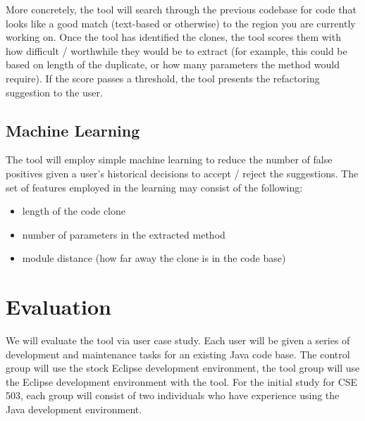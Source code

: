 \documentclass[preprint,10pt]{sigplanconf}
\begin{document}
More concretely, the tool will search through the previous codebase
for code that looks like a good match (text-based or otherwise) to the
region you are currently working on.  Once the tool has identified the
clones, the tool scores them with how difficult / worthwhile they
would be to extract (for example, this could be based on length of the
duplicate, or how many parameters the method would require).  If the
score passes a threshold, the tool presents the refactoring suggestion
to the user.  

\subsection{Machine Learning}
The tool will employ simple machine learning to reduce the number of
false positives given a user's historical decisions to accept / reject
the suggestions. The set of features employed in the learning may
consist of the following:

\begin{itemize}
  \item length of the code clone
  \item number of parameters in the extracted method
  \item module distance (how far away the clone is in the code base)
\end{itemize}

\section{Evaluation}


We will evaluate the tool via user case study. Each user will be given
a series of development and maintenance tasks for an existing Java
code base. The control group will use the stock Eclipse development
environment, the tool group will use the Eclipse development
environment with the tool. For the initial study for CSE 503, each
group will consist of two individuals who have experience using the
Java development environment.
\end{document}
